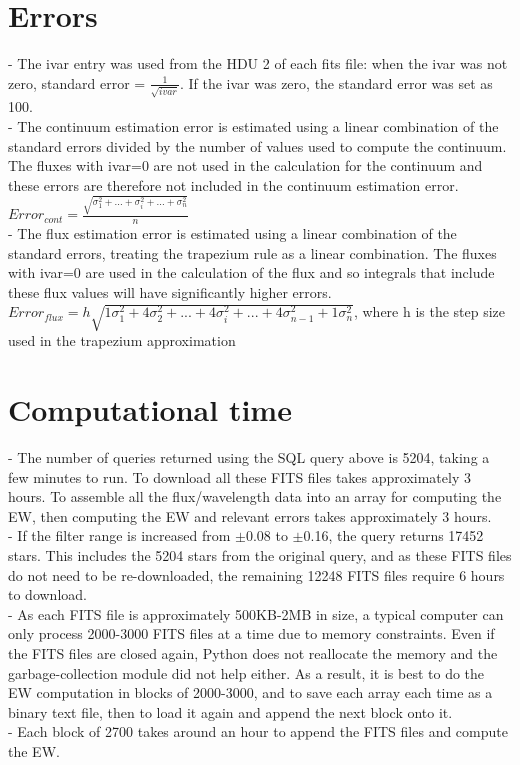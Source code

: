 \documentclass[12pt]{article}
\begin{document}
\section{Errors}
- The ivar entry was used from the HDU 2 of each fits file: when the ivar was not zero, standard error =  $\frac{1}{\sqrt{ivar}}$. If the ivar was zero, the standard error was set as 100. \\
- The continuum estimation error is estimated using a linear combination of the standard errors divided by the number of values used to compute the continuum. The fluxes with ivar=0 are not used in the calculation for the continuum and these errors are therefore not included in the continuum estimation error.\\
$Error_{cont} = \frac{\sqrt{\sigma_1^2 + ... + \sigma_i^2 + ... + \sigma_n^2}}{n}$\\
- The flux estimation error is estimated using a linear combination of the standard errors, treating the trapezium rule as a linear combination. The fluxes with ivar=0 are used in the calculation of the flux and so integrals that include these flux values will have significantly higher errors.\\
$Error_{flux} = h\sqrt{1\sigma_1^2+4\sigma_2^2+ ... + 4\sigma_i^2 + ... + 4\sigma_{n-1}^2+1\sigma_n^2}$, where h is the step size used in the trapezium approximation\\

\section{Computational time}
- The number of queries returned using the SQL query above is 5204, taking a few minutes to run. To download all these FITS files takes approximately 3 hours. To assemble all the flux/wavelength data into an array for computing the EW, then computing the EW and relevant errors takes approximately 3 hours. \\
- If the filter range is increased from $\pm$0.08 to $\pm$0.16, the query returns 17452 stars. This includes the 5204 stars from the original query, and as these FITS files do not need to be re-downloaded, the remaining 12248 FITS files require 6 hours to download.\\
- As each FITS file is approximately 500KB-2MB in size, a typical computer can only process 2000-3000 FITS files at a time due to memory constraints. Even if the FITS files are closed again, Python does not reallocate the memory and the garbage-collection module did not help either. As a result, it is best to do the EW computation in blocks of 2000-3000, and to save each array each time as a binary text file, then to load it again and append the next block onto it.\\
- Each block of 2700 takes around an hour to append the FITS files and compute the EW.
\end{document}
